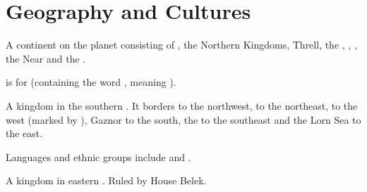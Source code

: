 \section{Geography and Cultures}
\begin{gloss}



\begin{comment}
\paragraph{\Azmith}
\end{comment}
\gitem{\Azmith}
A continent on the planet \Miith{} consisting of , the {Northern Kingdoms}, {Threll}, the , , {\Durcaccontinent}, the Near  and the {\Serplands}. %

\quo{\Azmith} is  for  (containing the word \quo{\Miith}, meaning ). 







\begin{comment}
\paragraph{Beirod}
\end{comment}
A kingdom in the southern . 
It borders  to the northwest,  to the northeast,  to the west (marked by ), {Gaznor} to the south, the \Risvaelsea{} to the southeast and the Lorn Sea to the east.  

Languages and ethnic groups include  and \Ortic. 









\begin{comment}
\paragraph{Belek}
\end{comment}
A kingdom in eastern . 
Ruled by House Belek.








\end{gloss}
